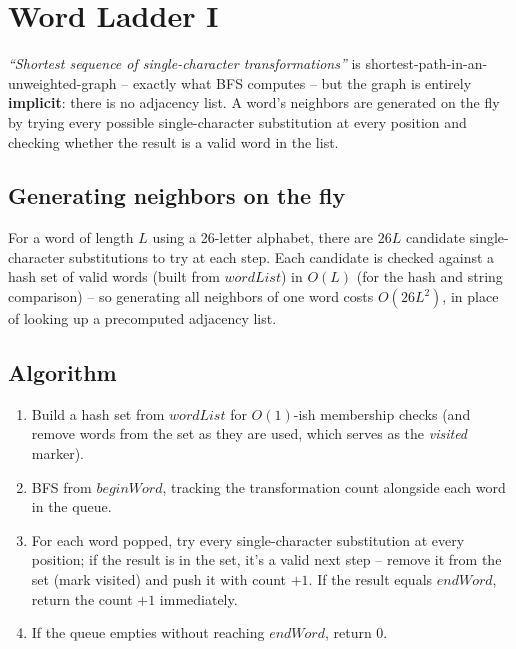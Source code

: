 \section{Word Ladder I}
\label{sec:graph-word-ladder-1}


\begin{patternbox}
\emph{``Shortest sequence of single-character transformations''} is
shortest-path-in-an-unweighted-graph -- exactly what BFS computes --
but the graph is entirely \textbf{implicit}: there is no adjacency
list. A word's neighbors are generated on the fly by trying every
possible single-character substitution at every position and checking
whether the result is a valid word in the list.
\end{patternbox}

\subsection*{Generating neighbors on the fly}

For a word of length $L$ using a 26-letter alphabet, there are
$26L$ candidate single-character substitutions to try at each step.
Each candidate is checked against a hash set of valid words (built
from $\textit{wordList}$) in $O(L)$ (for the hash and string
comparison) -- so generating all neighbors of one word costs
$O(26L^2)$, in place of looking up a precomputed adjacency list.

\subsection*{Algorithm}

\begin{enumerate}
  \item Build a hash set from $\textit{wordList}$ for $O(1)$-ish
        membership checks (and remove words from the set as they are
        used, which serves as the \textit{visited} marker).
  \item BFS from $\textit{beginWord}$, tracking the transformation
        count alongside each word in the queue.
  \item For each word popped, try every single-character substitution
        at every position; if the result is in the set, it's a valid
        next step -- remove it from the set (mark visited) and push it
        with count $+1$. If the result equals $\textit{endWord}$,
        return the count $+1$ immediately.
  \item If the queue empties without reaching $\textit{endWord}$,
        return $0$.
\end{enumerate}

